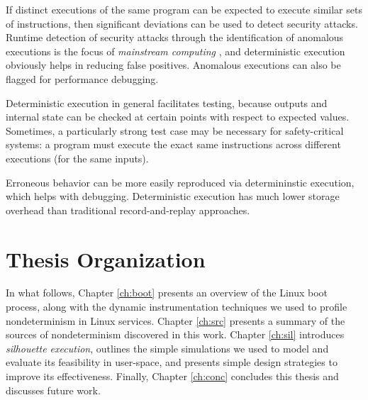  \newline
If distinct executions of the same program can be
expected to execute similar sets of instructions, then
significant deviations can be used to detect security
attacks. Runtime detection of security attacks through the
identification of anomalous executions is the focus of \emph{mainstream computing} \cite{stephenson2010mainstream},
and deterministic execution obviously helps in reducing false
positives. 
Anomalous executions can also be flagged for performance
debugging. \newline

  \newline
Deterministic execution in general facilitates testing,
because outputs and internal state can be checked at 
certain points with respect to expected values. 
Sometimes, a particularly strong 
test case may be necessary for safety-critical 
systems: a program 
must execute the exact same instructions 
across different executions (for the same inputs). \newline 

 \newline 
Erroneous behavior can be more easily reproduced
via determininstic execution, which
helps with debugging. Deterministic
execution has much lower storage overhead
than traditional record-and-replay approaches. 

\section{Thesis Organization} 
In what follows, Chapter \ref{ch:boot} presents an overview of
the Linux boot process, along with the dynamic instrumentation
techniques we used to profile nondeterminism in Linux services.
Chapter \ref{ch:src} presents a summary of the sources of nondeterminism
discovered in this work.
Chapter \ref{ch:sil} introduces {\em silhouette execution},
outlines the simple simulations we used to model
and evaluate its feasibility in user-space,
and presents simple design strategies to 
improve its effectiveness.
Finally, Chapter \ref{ch:conc} concludes this thesis and discusses future work.
